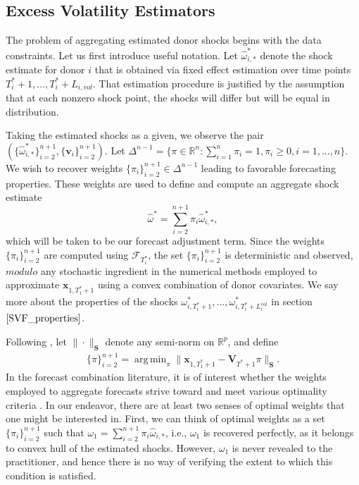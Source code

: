 \documentclass{uiucthesis2021}
\newcommand{\V}{\textbf{V}}
\newcommand{\weight}{\pi}
\newcommand{\x}{\textbf{x}}
\DeclareMathOperator*{\argmin}{arg\,min} %
\theoremstyle{definition}
\begin{document}
\subsection{Excess Volatility Estimators}
    \label{Excess Volatility Estimators}
   
    The problem of aggregating estimated donor shocks begins with the data constraints.  Let us first introduce useful notation.  Let $\hat\omega^{*}_{i,*}$ denote the shock estimate for donor $i$ that is obtained via fixed effect estimation over time points $T_{i}^{*}+1,...,T_{i}^{*}+L_{i,vol}$.  That estimation procedure is justified by the assumption that at each nonzero shock point, the shocks will differ but will be equal in distribution.  
    
    Taking the estimated shocks as a given, we observe the pair $(\{\hat\omega^{*}_{i,*}\}^{n+1}_{i=2},\{\textbf{v}_{i}\}^{n+1}_{i=2})$.  Let $\Delta^{n-1} = \{\pi \in \mathbb{R}^n: \sum_{i=1}^n \pi_i = 1, \pi_i \geq 0, i = 1,...,n\}$.  We wish to recover weights $\{\weight_{i}\}^{n+1}_{i=2} \in \Delta^{n-1}$ leading to favorable forecasting properties.  These weights are used to define and compute an aggregate shock estimate 
\begin{equation} \label{adjustment}
	  \hat\omega^{*} = \sum^{n+1}_{i=2}\weight_{i}\hat\omega^{*}_{i,*},
\end{equation}
    which will be taken to be our forecast adjustment term.  Since the weights $\{\weight_{i}\}_{i=2}^{n+1}$ are computed using $\mathcal{F}_{T^{*}_{i}}$, the set $\{\weight_{i}\}_{i=2}^{n+1}$ is deterministic and observed, $\textit{modulo}$ any stochastic ingredient in the numerical methods employed to approximate $\x_{1,T_{1}^{*}+1}$ using a convex combination of donor covariates.  We say more about the properties of the shocks $\omega^{*}_{i,T_{i}^{*}+1},...,\omega^{*}_{i,T_{i}^{*}+L^{vol}_{i}}$ in section $\ref{SVF_properties}$. 

    Following \citet{abadie2003economic,abadie2010synthetic,lin2021minimizing}, let $\|\cdot\|_{\textbf{S}}$ denote any semi-norm on $\mathbb{R}^{p}$, and define
    \begin{align*}
    \{\pi\}_{i=2}^{n+1} = \argmin_{\pi}\|\x_{1,T_{1}^* + 1} - \V_{T^* + 1}\pi\|_{\textbf{S}}. 
    \end{align*}
In the forecast combination literature, it is of interest whether the weights employed to aggregate forecasts strive toward and meet various optimality criteria \citep{timmermann2006forecast,wang2023forecast}.  In our endeavor, there are at least two senses of optimal weights that one might be interested in.  First, we can think of optimal weights as a set $\{\weight_{i}\}_{i=2}^{n+1}$ such that $\omega_{1} = \sum^{n+1}_{i=2}\weight_{i}\hat\omega_{i,*}$, i.e., $\omega_{1}$ is recovered perfectly, as it belongs to convex hull of the estimated shocks. However, $\omega_{1}$ is never revealed to the practitioner, and hence there is no way of verifying the extent to which this condition is satisfied.
\end{document}
